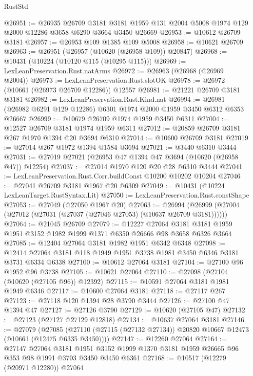 \begin{lexlean}{RustStd}
\begin{coremodule}
@26951 := @26935
    @26709
    @3181
    @3181
    @1959
    @131
    @2004
    @5008
    @1974
    @129
    @2000
    @12286
    @3658
    @6290
    @3664
    @3450
    @26669
@26953 := @10612 @26709 @3181
@26957 := @26953 @109 @1385 @109 @5008
@26958 := @10621 @26709
@26963 := @26951 (@26957 (@10620 (@26958 @109)) @20847)
@26968 := @10431 (@10224 (@10120 @115 (@10295 @115)))
@26969 := LexLeanPreservation.Rust.natArms
@26972 := @26963 (@26968 (@26969 @2004))
@26973 := LexLeanPreservation.Rust.slotOK
@26978 := @26972 (@10661 (@26973 @26709 @12286)) @12557
@26981 := @21221 @26709 @3181 @3181
@26982 := LexLeanPreservation.Rust.Kind.nat
@26994 := @26981 (@26982 @6291 @129 @12286) @6301 @1974 @2000 @1959 @3450 @6312 @6353 @26667
@26999 := @10679 @26709 @1974 @1959 @3450 @6311
@27004 := @12527 @26709 @3181 @1974 @1959 @6311
@27012 := @20859 @26709 @3181 @267 @1970 @1394 @20 @3694 @6310
@27014 := @10600 @26709 @3181
@27019 := @27014 @267 @1972 @1394 @1584 @3694
@27021 := @3440 @6310 @3444
@27031 := @27019 @27021 (@26953 @47 @1394 @47 @3694 (@10620 (@26958 @47)) @12254)
@27037 := @27014 @1970 @120 @20 @28 @6310 @3444
@27041 := LexLeanPreservation.Rust.Corr.buildConst @10200 @10202 @10204
@27046 := @27041 @26709 @3181 @1967 @20 @6309
@27049 := @10431 (@10224 LexLeanTarget.RustSyntax.Lit)
@27050 := LexLeanPreservation.Rust.constShape
@27053 := @27049 (@27050 @1967 @20)
@27063 := @26994 (@26999 (@27004 (@27012 (@27031 (@27037 (@27046 @27053) (@10637 @26709 @3181))))))
@27064 := @21045 @26709
@27079 := @12227
    @27064
    @3181
    @3181
    @1959
    @1951
    @3152
    @1982
    @1999
    @1371
    @6350
    @26666
    @98
    @3658
    @6326
    @3664
@27085 := @12404 @27064 @3181 @1982 @1951 @6342 @6348
@27098 := @12414 @27064 @3181 @118 @1949 @1951 @3738 @1981 @3450 @6346 @3181 @3731 @6334 @6338
@27100 := @10612 @27064 @3181
@27104 := @27100 @96 @1952 @96 @3738
@27105 := @10621 @27064
@27110 := @27098 (@27104 (@10620 (@27105 @96)) @12392)
@27115 := @10591 @27064 @3181 @1981 @1949 @6346
@27117 := @10600 @27064 @3181
@27118 := @27117 @267
@27123 := @27118 @120 @1394 @28 @3790 @3444
@27126 := @27100 @47 @1394 @47
@27127 := @27126 @3790
@27129 := @10620 (@27105 @47)
@27132 := @27123 (@27127 @27129 @12818)
@27134 := @10637 @27064 @3181
@27146 := @27079
    (@27085 (@27110 (@27115 (@27132 @27134)) @20820 @10667 @12473 (@10661 (@12475 @6335 @3450))))
@27147 := @12260 @27064
@27164 := @27147
    @27064
    @3181
    @1951
    @3152
    @1999
    @1370
    @3181
    @1959
    @26665
    @96
    @353
    @98
    @1991
    @3703
    @3450
    @3450
    @6361
@27168 := @10517 (@12279 (@20971 @12280)) @27064

\end{coremodule}
\end{lexlean}

